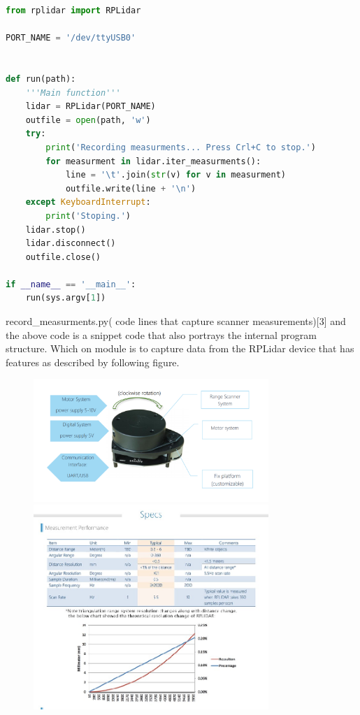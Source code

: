 \documentclass[10pt,draftclsnofoot,onecolumn,journal,compsoc]{IEEEtran}
\begin{document}
 \begin{center}		
\begin{lstlisting}[language=Python] 
from rplidar import RPLidar

PORT_NAME = '/dev/ttyUSB0'


def run(path):
    '''Main function'''
    lidar = RPLidar(PORT_NAME)
    outfile = open(path, 'w')
    try:
        print('Recording measurments... Press Crl+C to stop.')
        for measurment in lidar.iter_measurments():
            line = '\t'.join(str(v) for v in measurment)
            outfile.write(line + '\n')
    except KeyboardInterrupt:
        print('Stoping.')
    lidar.stop()
    lidar.disconnect()
    outfile.close()

if __name__ == '__main__':
    run(sys.argv[1])
\end{lstlisting} 
\end{center}
record\_measurments.py( code lines that capture scanner measurements)[3]
and the above code is a snippet code that also portrays  the internal program structure. Which on module is to capture data from the RPLidar device that has features as described by following figure. 
		\begin{figure}[ht]
		\centering \includegraphics[width=3.5in,natwidth=4000,natheight=400]{images/360rplidar.png}
		
    	 \centering \includegraphics[width=3.5in,natwidth=4000,natheight=400]{images/specifications.jpg}
    	\end{figure}
\pagebreak
      
\end{document}
